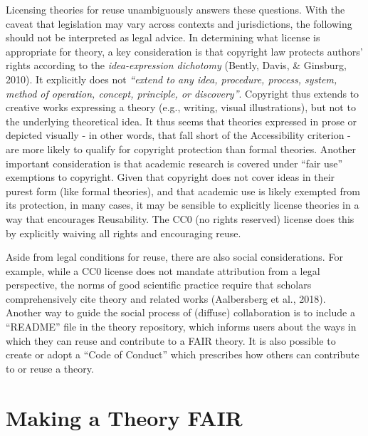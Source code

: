 \documentclass[
  man,floatsintext]{apa6}
\begin{document}
Licensing theories for reuse unambiguously answers these questions.
With the caveat that legislation may vary across contexts and jurisdictions, the following should not be interpreted as legal advice.
In determining what license is appropriate for theory,
a key consideration is that copyright law protects authors' rights according to the \emph{idea-expression dichotomy} (Bently, Davis, \& Ginsburg, 2010).
It explicitly does not
\emph{``extend to any idea, procedure, process, system, method of operation, concept, principle, or discovery''}.
Copyright thus extends to creative works expressing a theory (e.g., writing, visual illustrations),
but not to the underlying theoretical idea.
It thus seems that theories expressed in prose or depicted visually - in other words, that fall short of the Accessibility criterion - are more likely to qualify for copyright protection than formal theories.
Another important consideration is that academic research is covered under ``fair use'' exemptions to copyright.
Given that copyright does not cover ideas in their purest form (like formal theories), and that academic use is likely exempted from its protection,
in many cases, it may be sensible to explicitly license theories in a way that encourages Reusability.
The CC0 (no rights reserved) license does this by explicitly waiving all rights and encouraging reuse.

Aside from legal conditions for reuse, there are also social considerations.
For example, while a CC0 license does not mandate attribution from a legal perspective,
the norms of good scientific practice require that scholars comprehensively cite theory and related works (Aalbersberg et al., 2018).
Another way to guide the social process of (diffuse) collaboration is to include a ``README'' file in the theory repository, which informs users about the ways in which they can reuse and contribute to a FAIR theory.
It is also possible to create or adopt a ``Code of Conduct'' which prescribes how others can contribute to or reuse a theory.

\section{Making a Theory FAIR}\label{making-a-theory-fair}
\end{document}
